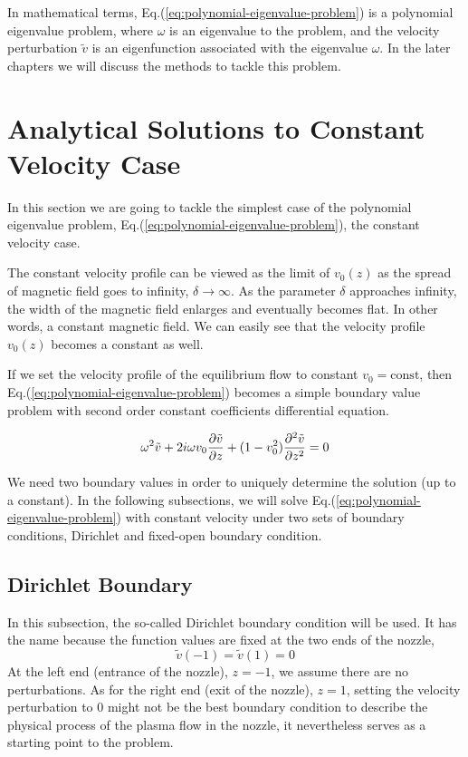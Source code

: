 In mathematical terms, Eq.(\ref{eq:polynomial-eigenvalue-problem}) is a polynomial eigenvalue problem, where $\omega$ is an eigenvalue to the problem, and the velocity perturbation $\tilde{v}$ is an eigenfunction associated with the eigenvalue $\omega$. In the later chapters we will discuss the methods to tackle this problem.

\section{Analytical Solutions to Constant Velocity Case}
In this section we are going to tackle the simplest case of the polynomial eigenvalue problem, Eq.(\ref{eq:polynomial-eigenvalue-problem}), the constant velocity case.

The constant velocity profile can be viewed as the limit of $v_0(z)$ as the spread of magnetic field goes to infinity, $\delta\to\infty$. As the parameter $\delta$ approaches infinity, the width of the magnetic field enlarges and eventually becomes flat. In other words, a constant magnetic field. We can easily see that the velocity profile $v_0(z)$ becomes a constant as well.

If we set the velocity profile of the equilibrium flow to constant $v_0=\text{const}$, then Eq.(\ref{eq:polynomial-eigenvalue-problem}) becomes a simple boundary value problem with second order constant coefficients differential equation.

\begin{equation} \label{eq:constant-v-problem-dirichlet}
	\omega^2\tilde{v} + 2i\omega v_0\pdv{\tilde{v}}{z} + (1-v_0^2)\pdv[2]{\tilde{v}}{z} = 0
\end{equation}

We need two boundary values in order to uniquely determine the solution (up to a constant). In the following subsections, we will solve Eq.(\ref{eq:polynomial-eigenvalue-problem}) with constant velocity under two sets of boundary conditions, Dirichlet and fixed-open boundary condition.

\subsection{Dirichlet Boundary}
In this subsection, the so-called Dirichlet boundary condition will be used. It has the name because the function values are fixed at the two ends of the nozzle,
\[ \tilde{v}(-1) = \tilde{v}(1) = 0 \]
At the left end (entrance of the nozzle), $z=-1$, we assume there are no perturbations. As for the right end (exit of the nozzle), $z=1$, setting the velocity perturbation to 0 might not be the best boundary condition to describe the physical process of the plasma flow in the nozzle, it nevertheless serves as a starting point to the problem.

